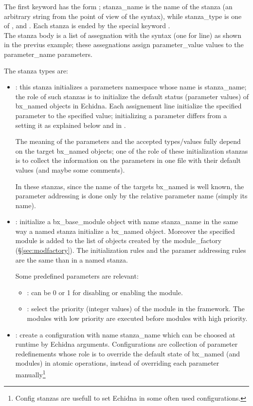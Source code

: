 \noindent The first keyword has the form ; stanza\_name is the name 
of the stanza (an arbitrary string from the point of view of the syntax), while stanza\_type is one of ,
 and . Each stanza is ended by the special keyword .\\
The stanza body is a list of assegnation with the syntax  
(one for line) as shown in the previus example; these assegnations assign parameter\_value values to 
the parameter\_name parameters.

The stanza types are:
\begin{itemize}
\item {}: this stanza initializes a parameters namespace whose name is stanza\_name; the role of 
such stanzas is to initialize the default status (parameter values) of bx\_named objects in Echidna.
Each assignement line initialize the specified parameter to the specified value; initializing a parameter
differs from a setting it as explained below and in .

The meaning of the parameters and the accepted types/values fully depend on the target bx\_named objects;
one of the role of these initialization stanzas is to collect the information on the parameters in one file
with their default values (and maybe some comments).

In these stanzas, since the name of the targets bx\_named is well known, the parameter addressing is done only
by the relative parameter name (simply its name).
\item {}: initialize a bx\_base\_module object with name stanza\_name in the same way a named
stanza initialize a bx\_named object. Moreover the specified module is added to the list of objects created by the
module\_factory (\S\ref{sec:modfactory}).
The initialization rules and the paramer addressing rules are the same than in a named stanza.

Some predefined parameters are relevant:
\begin{itemize}
\item {}: can be 0 or 1 for disabling or enabling the module.
\item {}: select the priority (integer values) of the module in the framework. The modules with low priority
are executed before modules with high priority.
\end{itemize}
\item {}: create a configuration with name stanza\_name which can be choosed at runtime by Echidna arguments.
Configurations are collection of parameter redefinements whose role is to override the default state of bx\_named 
(and modules) in atomic operations, instead of overriding each parameter manually\footnote{Config stanzas are usefull to
set Echidna in some often used configurations.}


\end{itemize}
